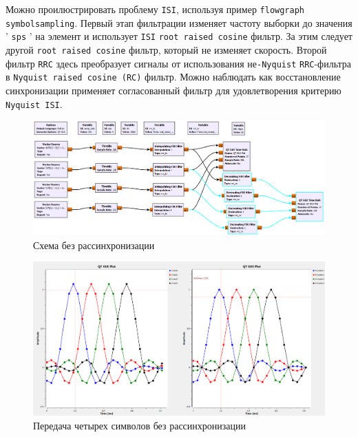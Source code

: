 \documentclass[a4paper]{article}
\begin{document}
           Можно проилюстрировать проблему \texttt{ISI}, используя пример \texttt{flowgraph \\symbolsampling}. Первый этап фильтрации изменяет частоту выборки до значения ’ \texttt{sps} ’ на элемент и использует \texttt{ISI} \texttt{root raised cosine} фильтр. За этим следует другой \texttt{root raised cosine} фильтр, который не изменяет скорость. Второй фильтр \texttt{RRC} здесь преобразует сигналы от использования не\texttt{-Nyquist} \texttt{RRC}-фильтра в \texttt{Nyquist raised cosine (RC)} фильтр. Можно наблюдать как восстановление синхронизации применяет согласованный фильтр для удовлетворения критерию \texttt{Nyquist ISI}.
            
            \begin{figure}[H]
                \centering
                \includegraphics[width=\textwidth]{ex_3_1.png}
                \caption{Схема без рассинхронизации}
                \label{fig:ex_3_1}
            \end{figure}
            
            \begin{figure}[H]
                \centering
                \includegraphics[width=\textwidth]{ex_3_2.png}
                \caption{Передача четырех символов без рассинхронизации}
                \label{fig:ex_3_2}
            \end{figure}
            
\end{document}
